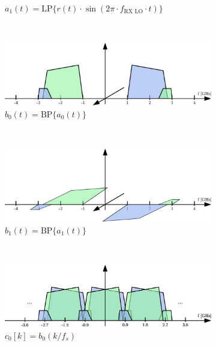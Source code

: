 \begin{figure}[p]
\begin{subfigure}{0.45\textwidth}
    \caption{$a_1(t) = \text{LP}\{r(t) \cdot \sin(2\pi \cdot f_{\text{RX LO}} \cdot t)\}$}
    \label{fig:rx_2_freq_a_1}
  \end{subfigure}
  \vspace{4ex} \\
  \begin{subfigure}{0.45\textwidth}
    \centering
    \includegraphics[width=\textwidth]{figures/rx_2_freq_b_0}
    \caption{$b_0(t) = \text{BP}\{a_0(t)\}$}
    \label{fig:rx_2_freq_b_0}
  \end{subfigure}
  ~
  \begin{subfigure}{0.45\textwidth}
    \centering
    \includegraphics[width=\textwidth]{figures/rx_2_freq_b_1}
    \caption{$b_1(t) = \text{BP}\{a_1(t)\}$}
    \label{fig:rx_2_freq_b_1}
  \end{subfigure}
  \vspace{4ex} \\
  \begin{subfigure}{0.45\textwidth}
    \centering
    \includegraphics[width=\textwidth]{figures/rx_2_freq_c_0}
    \caption{$c_0[k] = b_0(k/f_s)$}
    \label{fig:rx_2_freq_c_0}
  \end{subfigure}
  ~
  \begin{subfigure}{0.45\textwidth}

\end{subfigure}
\end{figure}
